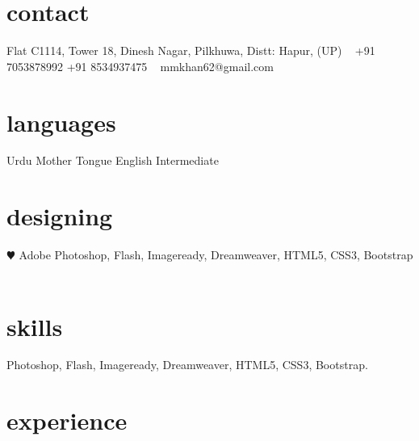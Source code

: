 \documentclass[]{cv-style}          %
\begin{document}
\lastupdated


\begin{aside}
%
\section{contact}
Flat C1114, Tower 18,
Dinesh Nagar, Pilkhuwa,
Distt: Hapur, (UP)
~
+91 7053878992
+91 8534937475
~
mmkhan62@gmail.com
%
\section{languages}
Urdu Mother Tongue
English Intermediate
%
\section{designing}
{\color{red} $\varheartsuit$} Adobe Photoshop, Flash, Imageready, Dreamweaver, HTML5, CSS3, Bootstrap
\
%
\end{aside}


\section{skills}
  \vspace{-0.2cm}

Photoshop, Flash, Imageready, Dreamweaver, HTML5, CSS3, Bootstrap.


\section{experience}
\end{document}
